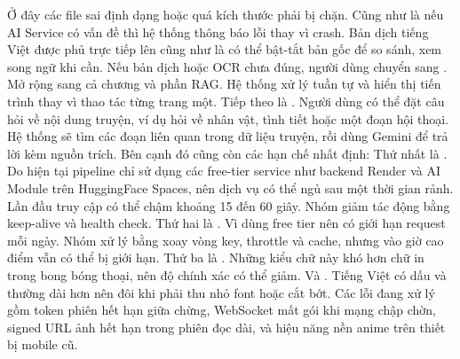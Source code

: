 {}Ở đây các file sai định dạng hoặc quá kích thước phải bị chặn. Cũng như là nếu AI Service có vấn đề thì hệ thống thông báo lỗi thay vì crash.\markdownRendererInterblockSeparator
{}
\markdownRendererSectionEnd \markdownRendererSectionBegin
{}\markdownRendererInterblockSeparator
{}Bản dịch tiếng Việt được phủ trực tiếp lên cũng như là có thể bật-tắt bản gốc để so sánh, xem song ngữ khi cần.\markdownRendererParagraphSeparator
{}Nếu bản dịch hoặc OCR chưa đúng, người dùng chuyển sang .\markdownRendererInterblockSeparator
{}
\markdownRendererSectionEnd \markdownRendererSectionBegin
{}\markdownRendererInterblockSeparator
{}Mở rộng sang cả chương và phần RAG.\markdownRendererParagraphSeparator
{}Hệ thống xử lý tuần tự và hiển thị tiến trình thay vì thao tác từng trang một.\markdownRendererParagraphSeparator
{}Tiếp theo là . Người dùng có thể đặt câu hỏi về nội dung truyện, ví dụ hỏi về nhân vật, tình tiết hoặc một đoạn hội thoại. Hệ thống sẽ tìm các đoạn liên quan trong dữ liệu truyện, rồi dùng Gemini để trả lời kèm nguồn trích.\markdownRendererInterblockSeparator
{}
\markdownRendererSectionEnd \markdownRendererSectionBegin
{}\markdownRendererInterblockSeparator
{}Bên cạnh đó cũng còn các hạn chế nhất định:\markdownRendererParagraphSeparator
{}Thứ nhất là . Do hiện tại pipeline chỉ sử dụng các free-tier service như backend Render và AI Module trên HuggingFace Spaces, nên dịch vụ có thể ngủ sau một thời gian rảnh. Lần đầu truy cập có thể chậm khoảng 15 đến 60 giây. Nhóm giảm tác động bằng keep-alive và health check.\markdownRendererParagraphSeparator
{}Thứ hai là . Vì dùng free tier nên có giới hạn request mỗi ngày. Nhóm xử lý bằng xoay vòng key, throttle và cache, nhưng vào giờ cao điểm vẫn có thể bị giới hạn.\markdownRendererParagraphSeparator
{}Thứ ba là . Những kiểu chữ này khó hơn chữ in trong bong bóng thoại, nên độ chính xác có thể giảm.\markdownRendererParagraphSeparator
{}Và . Tiếng Việt có dấu và thường dài hơn nên đôi khi phải thu nhỏ font hoặc cắt bớt.\markdownRendererParagraphSeparator
{}Các lỗi đang xử lý gồm token phiên hết hạn giữa chừng, WebSocket mất gói khi mạng chập chờn, signed URL ảnh hết hạn trong phiên đọc dài, và hiệu năng nền anime trên thiết bị mobile cũ.\markdownRendererInterblockSeparator
